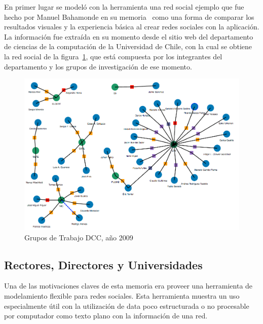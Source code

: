 En primer lugar se modeló con la herramienta una red social ejemplo que fue hecho por Manuel Bahamonde en su memoria~\cite{memoriamanuel} como una forma de comparar los resultados visuales y la experiencia básica al crear redes sociales con la aplicación.\\

La información fue extraída en su momento desde el sitio web del departamento de ciencias de la computación de la Universidad de Chile, con la cual se obtiene la red social de la figura~\ref{grupos_de_trabajo_dcc}, que está compuesta por los integrantes del departamento y los grupos de investigación de ese momento.

\begin{figure}[H]
  \centering
  \includegraphics[width=1.0\textwidth]{images/grupos_de_trabajo_dcc.png}
  \caption{Grupos de Trabajo DCC, año 2009}
  \label{grupos_de_trabajo_dcc}
\end{figure}


\subsection{Rectores, Directores y Universidades} %
\label{sub:rectores_directores_y_universidades}

Una de las motivaciones claves de esta memoria era proveer una herramienta de modelamiento flexible para redes sociales. Esta herramienta muestra un uso especialmente útil con la utilización de data poco estructurada o no procesable por computador como texto plano con la información de una red.\\

